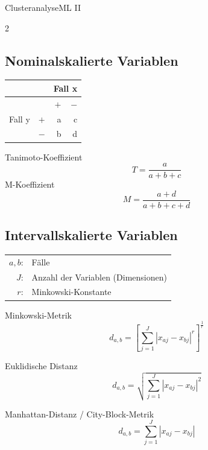 

\begin{formulaBox}{Clusteranalyse}{ML II}
\begin{multicols}{2}
\subsection*{Nominalskalierte Variablen}

\vspace{0.5cm}
\begin{center}
\begin{tabular}{lrrr}
   \toprule & & \multicolumn{2}{c}{Fall x} \\
    \midrule
    & & $+$ & $-$ \\
    Fall y & $+$ & a & c \\
    & $-$ & b & d \\
   \bottomrule
\end{tabular}
\end{center}

\vspace{0.5cm}
Tanimoto-Koeffizient
$$T=\frac{a}{a+b+c}$$
M-Koeffizient
$$M=\frac{a+d}{a+b+c+d}$$

\columnbreak
\subsection*{Intervallskalierte Variablen}

\begin{tabular}{rl}
$a,b$:& Fälle\\
$J$:& Anzahl der Variablen (Dimensionen)\\
$r$:& Minkowski-Konstante
\end{tabular}
\vspace{1em}

Minkowski-Metrik
$$d_{a,b}=\left[\sum\limits_{j=1}^J |x_{aj}-x_{bj}|^r \right]^{\frac{1}{r}}$$

Euklidische Distanz
$$d_{a,b}=\sqrt{\sum\limits_{j=1}^J|x_{aj}-x_{bj}|^2}$$

Manhattan-Distanz / City-Block-Metrik
$$d_{a,b}=\sum\limits_{j=1}^J|x_{aj}-x_{bj}|$$

\end{multicols}
\end{formulaBox}

